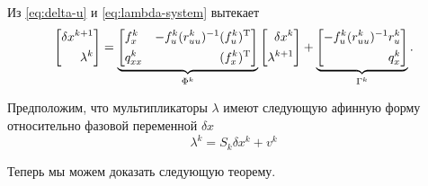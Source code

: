 Из \eqref{eq:delta-u} и \eqref{eq:lambda-system} вытекает
\begin{equation}
    \left[\begin{aligned}
        \delta x^{k+1}
        \\
        \lambda^{k}
    \end{aligned}\right]
    =
    \underbrace{\left[\begin{aligned}
        & f_x^k & -f^k_u (r^k_{uu})^{-1} (f^k_u)^\mathrm{T} &
        \\
        & q^k_{xx} & (f^k_x)^\mathrm{T} &
    \end{aligned}\right]}_{\Phi^k}
    \left[\begin{aligned}
        \delta x^k
        \\
        \lambda^{k+1}
    \end{aligned}\right]
    +
    \underbrace{\left[\begin{aligned}
        -f^k_u (r^k_{uu})^{-1} r^k_u
        \\
        q^k_x
    \end{aligned}\right]}_{\Gamma^k}.
\end{equation}

Предположим, что мультипликаторы $\lambda$ имеют следующую афинную форму относительно фазовой переменной $\delta x$
$$
    \lambda^{k} = S_k \delta x^k + v^k
$$

Теперь мы можем доказать следующую теорему.

